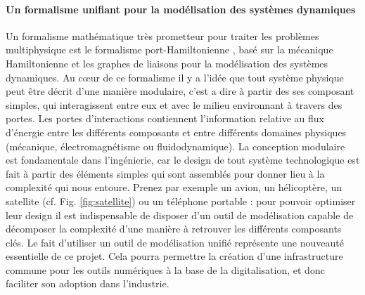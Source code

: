 \documentclass[12pt, french]{article}
\begin{document}
\paragraph{\large Un formalisme unifiant pour la modélisation des systèmes dynamiques\\}
Un formalisme mathématique très prometteur pour traiter les problèmes multiphysique est le formalisme port-Hamiltonienne \cite{vanderSchaft2002}, basé sur la mécanique Hamiltonienne et les graphes de liaisons pour la modélisation des systèmes dynamiques. Au c\oe{}ur de ce formalisme il y a l'idée que tout système physique peut être décrit d'une manière modulaire, c'est a dire à partir des ses composant simples, qui interagissent entre eux et avec le milieu environnant à travers des portes. Les portes d'interactions contiennent l'information relative au flux d'énergie entre les différents composants et entre différents domaines physiques (mécanique, électromagnétisme ou fluidodynamique). La conception modulaire est fondamentale dans l'ingénierie, car le design de tout système technologique est fait à partir des éléments simples qui sont assemblés pour donner lieu à la complexité qui nous entoure. Prenez par exemple un avion, un hélicoptère, un satellite (cf. Fig. \ref{fig:satellite}) ou un téléphone portable : pour pouvoir optimiser leur design il est indispensable de disposer d'un outil de modélisation capable de décomposer la complexité d'une manière à retrouver les différents composants clés. Le fait d’utiliser un outil de modélisation unifié représente une nouveauté essentielle de ce projet. Cela pourra permettre la création d’une infrastructure commune pour les outils numériques à la base de la digitalisation,  et donc faciliter son adoption dans l'industrie.
\end{document}
